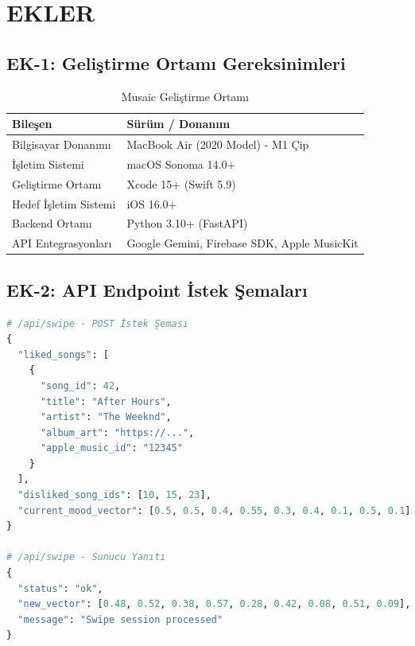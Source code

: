 \documentclass[12pt, a4paper]{report}
\begin{document}
\chapter*{EKLER}

\section*{EK-1: Geliştirme Ortamı Gereksinimleri}

\begin{table}[H]
  \centering
  \caption*{Musaic Geliştirme Ortamı}
  \renewcommand{\arraystretch}{1.35}
  \begin{tabular}{ll}
    \hline
    \textbf{Bileşen}     & \textbf{Sürüm / Donanım} \\
    \hline
    Bilgisayar Donanımı  & MacBook Air (2020 Model) - M1 Çip \\
    İşletim Sistemi      & macOS Sonoma 14.0+ \\
    Geliştirme Ortamı    & Xcode 15+ (Swift 5.9) \\
    Hedef İşletim Sistemi& iOS 16.0+ \\
    Backend Ortamı       & Python 3.10+ (FastAPI) \\
    API Entegrasyonları  & Google Gemini, Firebase SDK, Apple MusicKit \\
    \hline
  \end{tabular}
\end{table}

\section*{EK-2: API Endpoint İstek Şemaları}

\begin{lstlisting}[language=Python, caption={Toplu Kaydırma (Batch Swipe) JSON İsteği}]
# /api/swipe - POST İstek Şeması
{
  "liked_songs": [
    {
      "song_id": 42,
      "title": "After Hours",
      "artist": "The Weeknd",
      "album_art": "https://...",
      "apple_music_id": "12345"
    }
  ],
  "disliked_song_ids": [10, 15, 23],
  "current_mood_vector": [0.5, 0.5, 0.4, 0.55, 0.3, 0.4, 0.1, 0.5, 0.1]
}

# /api/swipe - Sunucu Yanıtı
{
  "status": "ok",
  "new_vector": [0.48, 0.52, 0.38, 0.57, 0.28, 0.42, 0.08, 0.51, 0.09],
  "message": "Swipe session processed"
}
\end{lstlisting}

\newpage
{}
{}
\end{document}
